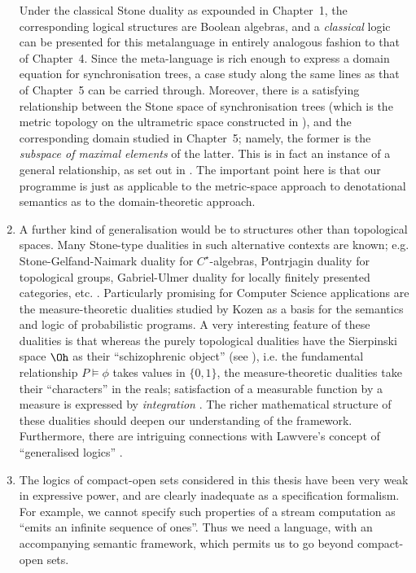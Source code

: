 \begin{enumerate}
Under the classical Stone duality as expounded in Chapter~1, the corresponding logical structures are Boolean algebras, and a {\em classical} logic can be presented for this metalanguage in entirely analogous fashion to that of Chapter~4.
Since the meta-language is rich enough to express a domain equation for 
synchronisation trees, a case study along the same lines as that of Chapter~5 can be carried through.
Moreover, there is a satisfying relationship between the Stone space of 
synchronisation trees (which is the metric topology on the ultrametric 
space constructed in \cite{deBZ82}), and the corresponding domain studied in 
Chapter~5; namely, the former is the {\em subspace of maximal elements} of the latter. 
This is in fact an instance of a general relationship, as set out in \cite{Abr85?}.
The important point here is that our programme is just as applicable to the metric-space  approach to denotational semantics as to the domain-theoretic approach.
\item A further kind of generalisation would be to structures other than topological spaces.
Many Stone-type dualities in such alternative contexts are known; e.g. Stone-Gelfand-Naimark duality for $C^{\star}$-algebras, Pontrjagin duality for topological groups, Gabriel-Ulmer duality for locally finitely presented categories, etc. \cite{Joh82}.
Particularly promising for Computer Science applications are the measure-theoretic dualities studied by Kozen \cite{Koz83} as a basis for the semantics and logic of probabilistic programs.
A very interesting feature of these dualities is that whereas the purely 
topological dualities have the Sierpinski space $\Oh$ as their 
``schizophrenic object'' (see \cite[Chapter 6]{Joh82}), i.e. the fundamental relationship $P \models \phi$ takes values in $\{ 0, 1 \}$, the measure-theoretic dualities take their ``characters'' in the reals; satisfaction of a measurable function by a measure is expressed by {\em integration} \cite{Koz83}.
The richer mathematical structure of these dualities should deepen our understanding of the framework.
Furthermore, there are intriguing connections with Lawvere's concept of ``generalised logics'' \cite{Law73}.
\item The logics of compact-open sets considered in this thesis have been very weak in expressive power, and are clearly inadequate as a specification formalism.
For example, we cannot specify such properties of a stream computation as ``emits an infinite sequence of ones''.
Thus we need a language, with an accompanying semantic framework, which permits us to go beyond compact-open sets.

\end{enumerate}
